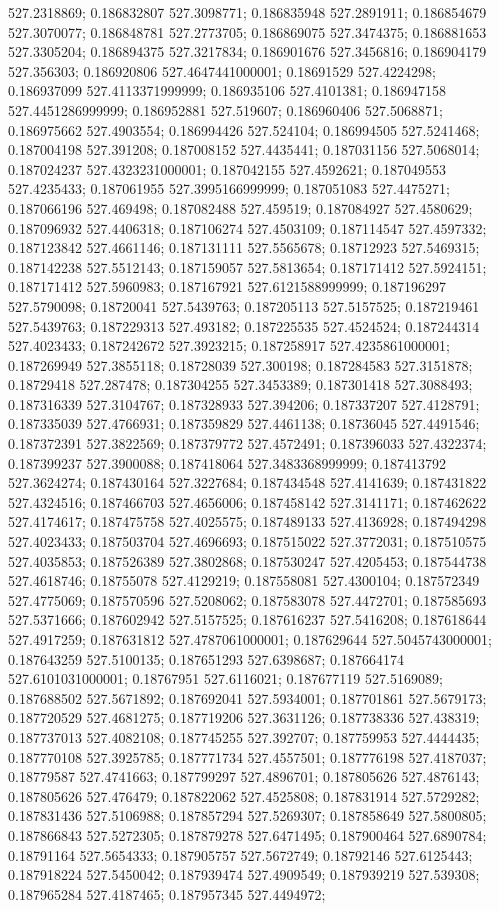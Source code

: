 527.2318869; 0.186832807 527.3098771; 0.186835948 527.2891911; 0.186854679 527.3070077; 0.186848781 527.2773705; 0.186869075 527.3474375; 0.186881653 527.3305204; 0.186894375 527.3217834; 0.186901676 527.3456816; 0.186904179 527.356303; 0.186920806 527.4647441000001; 0.18691529 527.4224298; 0.186937099 527.4113371999999; 0.186935106 527.4101381; 0.186947158 527.4451286999999; 0.186952881 527.519607; 0.186960406 527.5068871; 0.186975662 527.4903554; 0.186994426 527.524104; 0.186994505 527.5241468; 0.187004198 527.391208; 0.187008152 527.4435441; 0.187031156 527.5068014; 0.187024237 527.4323231000001; 0.187042155 527.4592621; 0.187049553 527.4235433; 0.187061955 527.3995166999999; 0.187051083 527.4475271; 0.187066196 527.469498; 0.187082488 527.459519; 0.187084927 527.4580629; 0.187096932 527.4406318; 0.187106274 527.4503109; 0.187114547 527.4597332; 0.187123842 527.4661146; 0.187131111 527.5565678; 0.18712923 527.5469315; 0.187142238 527.5512143; 0.187159057 527.5813654; 0.187171412 527.5924151; 0.187171412 527.5960983; 0.187167921 527.6121588999999; 0.187196297 527.5790098; 0.18720041 527.5439763; 0.187205113 527.5157525; 0.187219461 527.5439763; 0.187229313 527.493182; 0.187225535 527.4524524; 0.187244314 527.4023433; 0.187242672 527.3923215; 0.187258917 527.4235861000001; 0.187269949 527.3855118; 0.18728039 527.300198; 0.187284583 527.3151878; 0.18729418 527.287478; 0.187304255 527.3453389; 0.187301418 527.3088493; 0.187316339 527.3104767; 0.187328933 527.394206; 0.187337207 527.4128791; 0.187335039 527.4766931; 0.187359829 527.4461138; 0.18736045 527.4491546; 0.187372391 527.3822569; 0.187379772 527.4572491; 0.187396033 527.4322374; 0.187399237 527.3900088; 0.187418064 527.3483368999999; 0.187413792 527.3624274; 0.187430164 527.3227684; 0.187434548 527.4141639; 0.187431822 527.4324516; 0.187466703 527.4656006; 0.187458142 527.3141171; 0.187462622 527.4174617; 0.187475758 527.4025575; 0.187489133 527.4136928; 0.187494298 527.4023433; 0.187503704 527.4696693; 0.187515022 527.3772031; 0.187510575 527.4035853; 0.187526389 527.3802868; 0.187530247 527.4205453; 0.187544738 527.4618746; 0.18755078 527.4129219; 0.187558081 527.4300104; 0.187572349 527.4775069; 0.187570596 527.5208062; 0.187583078 527.4472701; 0.187585693 527.5371666; 0.187602942 527.5157525; 0.187616237 527.5416208; 0.187618644 527.4917259; 0.187631812 527.4787061000001; 0.187629644 527.5045743000001; 0.187643259 527.5100135; 0.187651293 527.6398687; 0.187664174 527.6101031000001; 0.18767951 527.6116021; 0.187677119 527.5169089; 0.187688502 527.5671892; 0.187692041 527.5934001; 0.187701861 527.5679173; 0.187720529 527.4681275; 0.187719206 527.3631126; 0.187738336 527.438319; 0.187737013 527.4082108; 0.187745255 527.392707; 0.187759953 527.4444435; 0.187770108 527.3925785; 0.187771734 527.4557501; 0.187776198 527.4187037; 0.18779587 527.4741663; 0.187799297 527.4896701; 0.187805626 527.4876143; 0.187805626 527.476479; 0.187822062 527.4525808; 0.187831914 527.5729282; 0.187831436 527.5106988; 0.187857294 527.5269307; 0.187858649 527.5800805; 0.187866843 527.5272305; 0.187879278 527.6471495; 0.187900464 527.6890784; 0.18791164 527.5654333; 0.187905757 527.5672749; 0.18792146 527.6125443; 0.187918224 527.5450042; 0.187939474 527.4909549; 0.187939219 527.539308; 0.187965284 527.4187465; 0.187957345 527.4494972; 